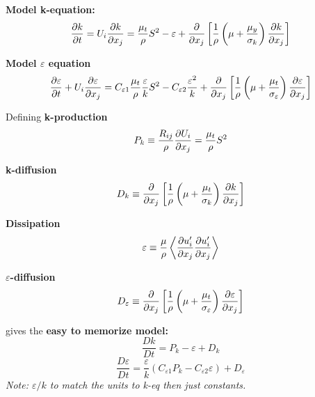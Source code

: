 \documentclass{article}
\let\epsilon\varepsilon
\begin{document}
\textbf{Model k-equation:}
\begin{equation}
	\pdv{k}{t} = U_{i}\pdv{k}{x_{j}} = \frac{\mu_{t}}{\rho}S^{2}-\epsilon + \pdv{x_{j}}\left[\frac{1}{\rho}\left(\mu + \frac{\mu _{y}}{\sigma_{k}}\right)\pdv{k}{x_{j}}\right]
\end{equation}

\textbf{Model $\epsilon$ equation}
\begin{equation}
	\pdv{\epsilon}{t} + U_{i}\pdv{\epsilon}{x_{j}} = C_{\epsilon 1}\frac{\mu_{t}}{\rho} \frac{\epsilon}{k}S^{2}- C_{\epsilon 2} \frac{\epsilon^{2}}{k} + \pdv{x_{j}}\left[\frac{1}{\rho}\left(\mu + \frac{\mu_{t}}{\sigma_\epsilon}\right)\pdv{\epsilon}{x_{j}}\right]
\end{equation}


Defining \textbf{k-production}
\begin{equation}
	P_{k} \equiv \frac{R_{ij}}{\rho}\pdv{U_{i}}{x_{j}} = \frac{\mu_{t}}{\rho}S^{2}
\end{equation}

\textbf{k-diffusion}
\begin{equation}
	D_{k} \equiv \pdv{x_{j}}\left[\frac{1}{\rho}\left(\mu + \frac{\mu_{t}}{\sigma_{k}}\right)\pdv{k}{x_{j}}\right]
\end{equation}

\textbf{Dissipation}
\begin{equation}
	\epsilon \equiv \frac{\mu}{\rho} \left\langle\pdv{u_{i}'}{x_{j}}\pdv{u_{i}'}{x_{j}}\right\rangle
\end{equation}

\textbf{$\epsilon$-diffusion}
\begin{equation}
	D_{\epsilon}\equiv \pdv{x_{j}}\left[\frac{1}{\rho}\left(\mu + \frac{\mu_{t}}{\sigma_{\epsilon}}\right)\pdv{\epsilon}{x_{j}}\right]
\end{equation}


gives the \textbf{easy to memorize model: }
\begin{equation}
	\boxed{
	\frac{Dk}{Dt} = P_{k} - \epsilon + D_{k}
	}
\end{equation}
\begin{equation}
	\boxed{
	\frac{D\epsilon}{Dt} = \frac{\epsilon}{k}\left(C_{\epsilon 1}P_{k} - C_{\epsilon 2}\epsilon\right) + D_{\epsilon}
	}
\end{equation}
\textit{Note: $\epsilon/k$ to match the units to k-eq then just constants.}
\end{document}
